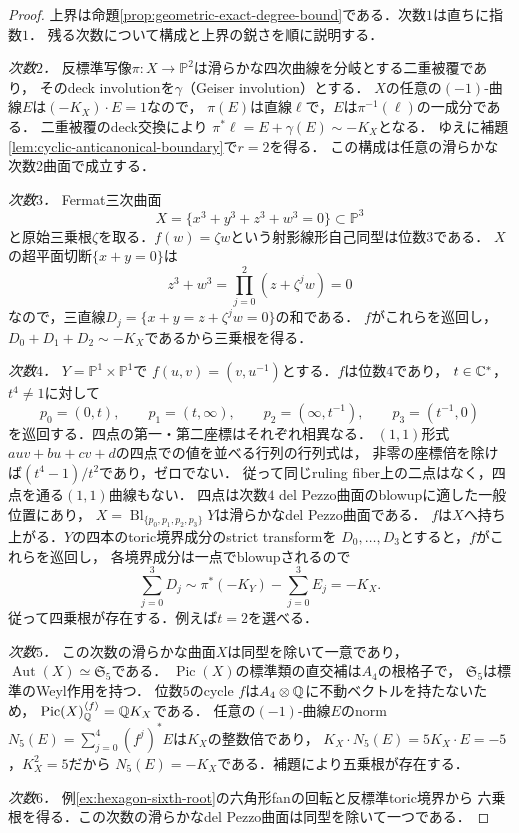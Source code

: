 \documentclass[11pt,a4paper]{ltjsarticle}
\begin{document}
\begin{proof}
上界は命題\ref{prop:geometric-exact-degree-bound}である．次数$1$は直ちに指数$1$．
残る次数について構成と上界の鋭さを順に説明する．

\emph{次数$2$．}
反標準写像$\pi:X\to\mathbb P^2$は滑らかな四次曲線を分岐とする二重被覆であり，
そのdeck involutionを$\gamma$（Geiser involution）とする．
$X$の任意の$(-1)$-曲線$E$は$(-K_X)\cdot E=1$なので，
$\pi(E)$は直線$\ell$で，$E$は$\pi^{-1}(\ell)$の一成分である．
二重被覆のdeck交換により
$\pi^*\ell=E+\gamma(E)\sim-K_X$となる．
ゆえに補題\ref{lem:cyclic-anticanonical-boundary}で$r=2$を得る．
この構成は任意の滑らかな次数2曲面で成立する．

\emph{次数$3$．}
Fermat三次曲面
\[
 X=\{x^3+y^3+z^3+w^3=0\}\subset\mathbb P^3
\]
と原始三乗根$\zeta$を取る．$f(w)=\zeta w$という射影線形自己同型は位数$3$である．
$X$の超平面切断$\{x+y=0\}$は
\[
 z^3+w^3=\prod_{j=0}^2(z+\zeta^jw)=0
\]
なので，三直線$D_j=\{x+y=z+\zeta^jw=0\}$の和である．
$f$がこれらを巡回し，$D_0+D_1+D_2\sim-K_X$であるから三乗根を得る．

\emph{次数$4$．}
$Y=\mathbb P^1\times\mathbb P^1$で
$f(u,v)=(v,u^{-1})$とする．$f$は位数$4$であり，
$t\in\mathbb C^*$，$t^4\ne1$に対して
\[
 p_0=(0,t),\qquad p_1=(t,\infty),\qquad
 p_2=(\infty,t^{-1}),\qquad p_3=(t^{-1},0)
\]
を巡回する．四点の第一・第二座標はそれぞれ相異なる．
$(1,1)$形式$a uv+bu+cv+d$の四点での値を並べる行列の行列式は，
非零の座標倍を除けば$(t^4-1)/t^2$であり，ゼロでない．
従って同じruling fiber上の二点はなく，四点を通る$(1,1)$曲線もない．
四点は次数$4$ del Pezzo曲面のblowupに適した一般位置にあり，
$X=\operatorname{Bl}_{\{p_0,p_1,p_2,p_3\}}Y$は滑らかなdel Pezzo曲面である．
$f$は$X$へ持ち上がる．$Y$の四本のtoric境界成分のstrict transformを
$D_0,\ldots,D_3$とすると，$f$がこれらを巡回し，
各境界成分は一点でblowupされるので
\[
 \sum_{j=0}^3 D_j\sim \pi^*(-K_Y)-\sum_{j=0}^3E_j=-K_X.
\]
従って四乗根が存在する．例えば$t=2$を選べる．

\emph{次数$5$．}
この次数の滑らかな曲面$X$は同型を除いて一意であり，
$\operatorname{Aut}(X)\simeq\mathfrak S_5$である\cite{BauerCatanese}．
$\operatorname{Pic}(X)$の標準類の直交補は$A_4$の根格子で，
$\mathfrak S_5$は標準のWeyl作用を持つ．
位数$5$のcycle $f$は$A_4\otimes\mathbb Q$に不動ベクトルを持たないため，
$\operatorname{Pic}(X)_{\mathbb Q}^{\langle f\rangle}=\mathbb Q K_X$である．
任意の$(-1)$-曲線$E$のnorm
$N_5(E)=\sum_{j=0}^4(f^j)^*E$は$K_X$の整数倍であり，
$K_X\cdot N_5(E)=5K_X\cdot E=-5$，$K_X^2=5$だから
$N_5(E)=-K_X$である．補題により五乗根が存在する．

\emph{次数$6$．}
例\ref{ex:hexagon-sixth-root}の六角形fanの回転と反標準toric境界から
六乗根を得る．この次数の滑らかなdel Pezzo曲面は同型を除いて一つである．


\end{proof}
\end{document}
